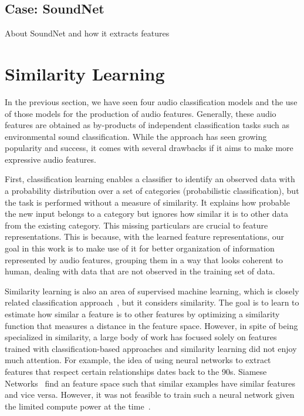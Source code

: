 \subsection{Case: SoundNet}
About SoundNet and how it extracts features

\section{Similarity Learning}
In the previous section, we have seen four audio classification models and the use of those models for the production of audio features. Generally, these audio features are obtained as by-products of independent classification tasks such as environmental sound classification. While the approach has seen growing popularity and success, it comes with several drawbacks if it aims to make more expressive audio features.

First, classification learning enables a classifier to identify an observed data with a probability distribution over a set of categories (probabilistic classification), but the task is performed without a measure of similarity. It explains how probable the new input belongs to a category but ignores how similar it is to other data from the existing category. This missing particulars are crucial to feature representations. This is because, with the learned feature representations, our goal in this work is to make use of it for better organization of information represented by audio features, grouping them in a way that looks coherent to human, dealing with data that are not observed in the training set of data.

Similarity learning is also an area of supervised machine learning, which is closely related classification approach~\cite{andrew2018}, but it considers similarity. The goal is to learn to estimate how similar a feature is to other features by optimizing a similarity function that measures a distance in the feature space. However, in spite of being specialized in similarity, a large body of work has focused solely on features trained with classification-based approaches and similarity learning did not enjoy much attention. For example, the idea of using neural networks to extract features that respect certain relationships dates back to the 90s. Siamese Networks~\cite{bromley1993} find an feature space such that similar examples have similar features and vice versa. However, it was not feasible to train such a neural network given the limited compute power at the time~\cite{chao2017}.

